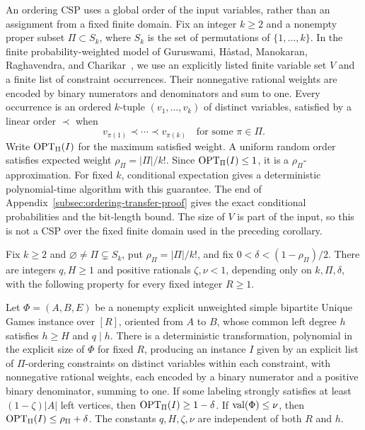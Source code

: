 An ordering CSP uses a global order of the input variables, rather than
an assignment from a fixed finite domain. Fix an integer \(k\ge2\) and
a nonempty proper subset \(\Pi\subset S_k\), where \(S_k\) is the set
of permutations of \(\{1,\ldots,k\}\). In the finite
probability-weighted model of Guruswami, H\aa stad, Manokaran,
Raghavendra, and Charikar~\cite[Definition~8.2]{GuruswamiEtAl2011OrderingCSP},
we use an explicitly listed finite variable set \(V\) and a finite list of
constraint occurrences. Their nonnegative rational weights are encoded
by binary numerators and denominators and sum to one. Every occurrence is an
ordered \(k\)-tuple \((v_1,\ldots,v_k)\) of distinct variables,
satisfied by a linear order \(\prec\) when
\[
 v_{\pi(1)}\prec\cdots\prec v_{\pi(k)}
 \quad\text{for some }\pi\in\Pi.
\]
Write \(\operatorname{OPT}_\Pi(I)\) for the maximum satisfied weight. A uniform
random order satisfies expected weight \(\rho_\Pi=|\Pi|/k!\).
Since \(\operatorname{OPT}_\Pi(I)\le1\), it is a \(\rho_\Pi\)-approximation.
For fixed \(k\), conditional expectation gives a deterministic
polynomial-time algorithm with this guarantee. The end of
Appendix~\ref{subsec:ordering-transfer-proof} gives the exact
conditional probabilities and the bit-length bound.
The size of \(V\) is part
of the input, so this is not a CSP over the fixed finite domain used
in the preceding corollary.

\begin{proposition}
\label{prop:finite-ordering-transfer}
Fix \(k\ge2\) and \(\varnothing\ne\Pi\subsetneq S_k\), put
\(\rho_\Pi=|\Pi|/k!\), and fix
\(0<\delta<(1-\rho_\Pi)/2\).  There are integers
\(q,H\ge1\) and positive rationals \(\zeta,\nu<1\), depending only
on \(k,\Pi,\delta\), with the following property for every fixed
integer \(R\ge1\).

Let \(\Phi=(A,B,E)\) be a nonempty explicit unweighted simple
bipartite Unique Games instance over \([R]\), oriented from \(A\) to
\(B\), whose common left degree \(h\) satisfies \(h\ge H\) and
\(q\mid h\).  There is a deterministic transformation, polynomial in
the explicit size of \(\Phi\) for fixed \(R\), producing an instance \(I\) given by an explicit
list of \(\Pi\)-ordering constraints on distinct variables within
each constraint, with nonnegative rational weights, each encoded by
a binary numerator and a positive binary denominator, summing to one.
If some labeling strongly satisfies at least
\((1-\zeta)|A|\) left vertices, then \(\operatorname{OPT}_\Pi(I)\ge1-\delta\).
If \(\operatorname{val}(\Phi)\le\nu\), then
\(\operatorname{OPT}_\Pi(I)\le\rho_\Pi+\delta\).
The constants \(q,H,\zeta,\nu\) are independent of both \(R\) and
\(h\).
\end{proposition}

